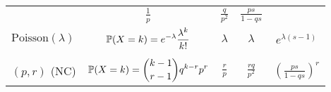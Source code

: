 \begin{table}[h!]
\begin{tabular}{|lcccc|}
&  $\displaystyle \frac1p$ & $\displaystyle \frac{q}{p^2}$ & $\displaystyle \frac{ps}{1-qs}$
\\[3.5ex]
\begin{minipage}{0.20\textwidth} \raggedright 
$\text{Poisson}(\lambda)$
\end{minipage}   &  
\begin{minipage}{0.32\textwidth} \raggedright
$\displaystyle {\mathbb P}(X=k) = e^{-\lambda}\frac{\lambda^k}{k!}$ \end{minipage}  
&  $\lambda$ & $\lambda$ & $\displaystyle e^{\lambda(s-1)}$ \\[3.5ex]
\begin{minipage}{0.17\textwidth} \raggedright 
$\text{Negative binomial}$\\
$(p,r)$ (NC)
\end{minipage}   &  
\begin{minipage}{0.32\textwidth} \raggedright
$\displaystyle {\mathbb P}(X=k) = \binom{k-1}{r-1}q^{k-r} p^r$ \end{minipage}  
&  $\displaystyle \frac{r}p$ & $\displaystyle \frac{rq}{p^2}$ & $\displaystyle \left(\frac{ps}{1-qs}\right)^r$ 
\\[3.5ex] \hline 
\end{tabular}
\end{table}  

